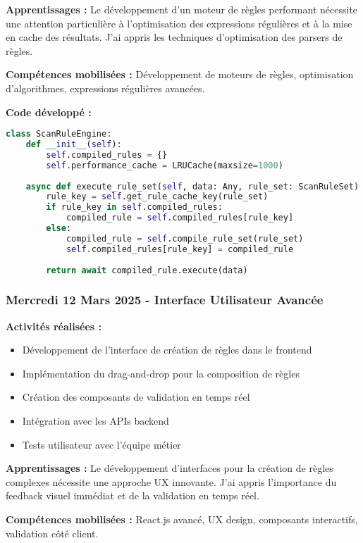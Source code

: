 \textbf{Apprentissages :}
Le développement d'un moteur de règles performant nécessite une attention particulière à l'optimisation des expressions régulières et à la mise en cache des résultats. J'ai appris les techniques d'optimisation des parsers de règles.

\textbf{Compétences mobilisées :}
Développement de moteurs de règles, optimisation d'algorithmes, expressions régulières avancées.

\textbf{Code développé :}
\begin{lstlisting}[language=Python, caption=Moteur de règles personnalisées]
class ScanRuleEngine:
    def __init__(self):
        self.compiled_rules = {}
        self.performance_cache = LRUCache(maxsize=1000)
    
    async def execute_rule_set(self, data: Any, rule_set: ScanRuleSet):
        rule_key = self.get_rule_cache_key(rule_set)
        if rule_key in self.compiled_rules:
            compiled_rule = self.compiled_rules[rule_key]
        else:
            compiled_rule = self.compile_rule_set(rule_set)
            self.compiled_rules[rule_key] = compiled_rule
        
        return await compiled_rule.execute(data)
\end{lstlisting}

\subsubsection{Mercredi 12 Mars 2025 - Interface Utilisateur Avancée}

\textbf{Activités réalisées :}
\begin{itemize}
    \item Développement de l'interface de création de règles dans le frontend
    \item Implémentation du drag-and-drop pour la composition de règles
    \item Création des composants de validation en temps réel
    \item Intégration avec les APIs backend
    \item Tests utilisateur avec l'équipe métier
\end{itemize}

\textbf{Apprentissages :}
Le développement d'interfaces pour la création de règles complexes nécessite une approche UX innovante. J'ai appris l'importance du feedback visuel immédiat et de la validation en temps réel.

\textbf{Compétences mobilisées :}
React.js avancé, UX design, composants interactifs, validation côté client.


